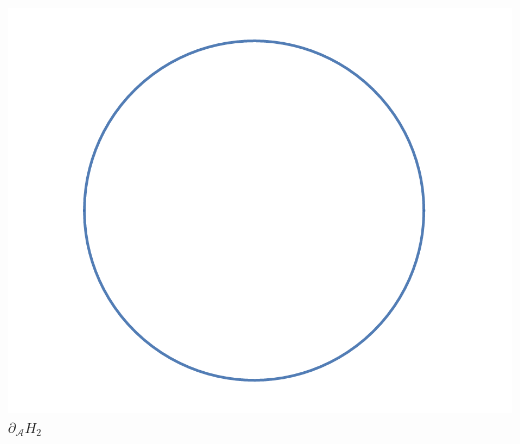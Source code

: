 \documentclass[12pt]{article}
\newcommand{\cA}{{\mathcal A}}
\theoremstyle{definition}
\begin{document}
\begin{enumerate}
\begin{center}
				\includegraphics[scale = 0.4]{D_H_0.png}\\
				$\partial_\cA H_2$
		  \end{center}
\end{enumerate}
\end{document}
